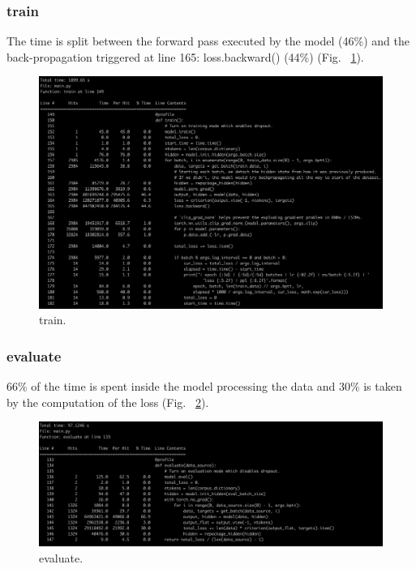 \documentclass[11pt]{article}
\newcommand{\0}{\mat{0}}
\begin{document}
\begin{itemize}
   \subsubsection*{train}
   The time is split between the forward pass executed by the model (46\%) and the back-propagation triggered at line 165: loss.backward() (44\%) (Fig. ~\ref{fig:train}).
   \begin{figure}[h]
  	\centering
 	 \includegraphics[width=\linewidth]{train.png}
 	 \caption{train.}
 	 \label{fig:train}
   \end{figure}


   \subsubsection*{evaluate}
   66\% of the time is spent inside the model processing the data and 30\% is taken by the computation of the loss (Fig. ~\ref{fig:evaluate}).
   \begin{figure}[h!]
  	\centering
 	 \includegraphics[width=\linewidth]{evaluate.png}
 	 \caption{evaluate.}
 	 \label{fig:evaluate}
   \end{figure}


\end{itemize}
\end{document}
